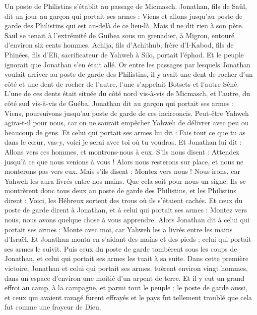 \begin{multicols}{2}
Un poste de Philistins s’établit au passage de Micmasch.
\VerseOne{}Jonathan, fils de Saül, dit un jour au garçon qui portait ses armes : Viens et allons jusqu’au poste de garde des Philistins qui est au-delà de ce lieu-là. Mais il ne dit rien à son père.
Saül se tenait à l'extrémité de Guibea sous un grenadier, à Migron, entouré d'environ six cents hommes.
Achija, fils d'Achithub, frère d'I-Kabod, fils de Phinées, fils d'Eli, sacrificateur de Yahweh à Silo, portait l'éphod. Et le peuple ignorait que Jonathan s'en était allé.
Or entre les passages par lesquels Jonathan voulait arriver au poste de garde des Philistins, il y avait une dent de rocher d’un côté et une dent de rocher de l’autre, l'une s’appelait Botsets et l'autre Séné.
L'une de ces dents était située du côté nord vis-à-vis de Micmasch, et l'autre, du côté sud vis-à-vis de Guéba.
Jonathan dit au garçon qui portait ses armes : Viens, poursuivons jusqu’au poste de garde de ces incirconcis. Peut-être Yahweh agira-t-il pour nous, car on ne saurait empêcher Yahweh de délivrer avec peu ou beaucoup de gens.
Et celui qui portait ses armes lui dit : Fais tout ce que tu as dans le cœur, vas-y, voici je serai avec toi où tu voudras.
Et Jonathan lui dit : Allons vers ces hommes, et montrons-nous à eux.
S'ils nous disent : Attendez jusqu'à ce que nous venions à vous ! Alors nous resterons sur place, et nous ne monterons pas vers eux.
Mais s'ils disent : Montez vers nous ! Nous irons, car Yahweh les aura livrés entre nos mains. Que cela soit pour nous un signe.
Ils se montrèrent donc tous deux au poste de garde des Philistins, et les Philistins dirent : Voici, les Hébreux sortent des trous où ils s'étaient cachés.
Et ceux du poste de garde dirent à Jonathan, et à celui qui portait ses armes : Montez vers nous, nous avons quelque chose à vous apprendre. Alors Jonathan dit à celui qui portait ses armes : Monte avec moi, car Yahweh les a livrés entre les mains d'Israël.
Et Jonathan monta en s’aidant des mains et des pieds ; celui qui portait ses armes le suivit. Puis ceux du poste de garde tombèrent sous les coups de Jonathan, et celui qui portait ses armes les tuait à sa suite.
Dans cette première victoire, Jonathan et celui qui portait ses armes, tuèrent environ vingt hommes, dans un espace d'environ une moitié d’un arpent de terre.
Et il y eut un grand effroi au camp, à la campagne, et parmi tout le peuple ; le poste de garde aussi, et ceux qui avaient ravagé furent effrayés et le pays fut tellement troublé que cela fut comme une frayeur de Dieu.

\end{multicols}
